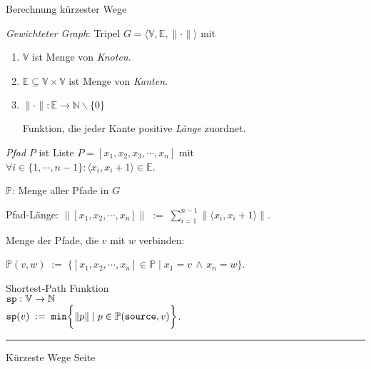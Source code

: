 \documentclass{slides}
\newcommand{\nodes}{{\mathbb V}}
\newcommand{\edges}{{\mathbb E}}
\newcommand{\paths}{{\mathbb P}}
\newcommand{\weight}[1]{\|#1\|}
\newcommand{\Weight}[1]{\bigl\|#1\bigr\|}
\newcommand{\N}{{\mathbb N}}
\newcommand{\df}{\;:=\;}
\newcommand{\source}{\mbox{\tt source}}
\newcommand{\spath}{\mbox{\tt sp}}
\newcounter{mypage}
\def\pair(#1,#2){\langle #1, #2 \rangle}
\begin{document}

\begin{slide}{}
\normalsize

\begin{center}
 Berechnung k\"urzester Wege
\end{center}
\vspace*{0.5cm}

\footnotesize
{\em Gewichteter Graph}:  \quad 
 Tripel $G = \langle \nodes, \edges, \weight{\cdot} \rangle$ mit
\begin{enumerate}
\item $\nodes$ ist Menge von \textsl{Knoten}.
\item $\edges \subseteq \nodes \times \nodes$ ist Menge von \textsl{Kanten}.
\item $\weight{\cdot}: \edges \rightarrow \N \backslash\{0\}$ 

      Funktion, die jeder Kante positive \textsl{L\"ange} zuordnet.
\end{enumerate}

\textsl{Pfad} $P$ ist  Liste  $P = [ x_1, x_2, x_3, \cdots, x_n ]$  mit\\[0.3cm]
\hspace*{1.3cm} 
$\forall i \in \{1, \cdots, n-1\}\colon \pair(x_i,x_{i+1}) \in \edges$. 

$\mathbb{P}$:  Menge aller Pfade in $G$

Pfad-L\"ange:  \quad
$\Weight{[x_1,x_2, \cdots, x_n]} \df \sum\limits_{i=1}^{n-1}
\Weight{\pair(x_i,x_{i+1})}$. 

Menge der Pfade, die  $v$ mit  $w$ verbinden: 

 $\paths(v,w) \df \biggl\{ [x_1, x_2, \cdots, x_n] \in \paths \mid  x_1 = v \,\wedge\, x_n = w \}$.

Shortest-Path Funktion \\[0.3cm]
\hspace*{1.3cm} 
 $\spath: \nodes \rightarrow \N$ \\[0.3cm] 
\hspace*{1.3cm} 
 $\spath(v) \df \mathtt{min}\biggl\{ \weight{p} \mid p \in \paths(\source,v) \biggr\}$.


\vspace*{\fill}
\tiny \addtocounter{mypage}{1}
\rule{17cm}{1mm}
K\"urzeste Wege \hspace*{\fill} Seite 
\end{slide}

\end{document}
